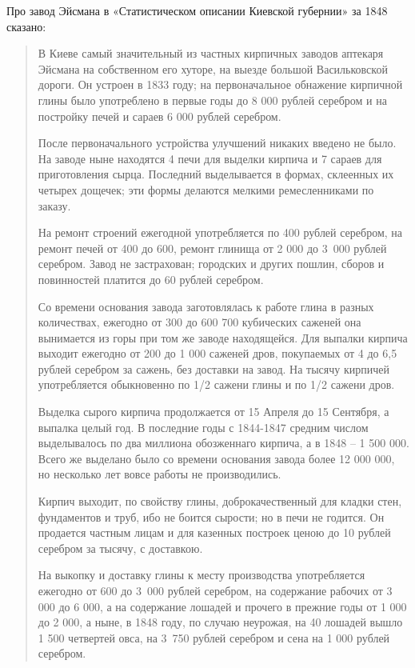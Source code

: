 Про завод Эйсмана в «Статистическом описании Киевской губернии»\cite{fundstat} за 1848 сказано:

\begin{quotation}
В Киеве самый значительный из частных кирпичных заводов аптекаря Эйсмана на собственном его хуторе, на выезде большой Васильковской дороги. Он устроен в 1833 году; на первоначальное обнажение кирпичной глины было употреблено в первые годы до 8 000 рублей серебром и на постройку печей и сараев 6 000 рублей серебром. 

После первоначального устройства улучшений никаких введено не было. На заводе ныне находятся 4 печи для выделки кирпича и 7 сараев для приготовления сырца. Последний выделывается в формах, склеенных их четырех дощечек; эти формы делаются мелкими ремесленниками по заказу. 

На ремонт строений ежегодной употребляется по 400 рублей серебром, на ремонт печей от 400 до 600, ремонт глинища от 2 000 до \mbox{3 000} рублей серебром. Завод не застрахован; городских и других пошлин, сборов и повинностей платится до 60 рублей серебром.

Со времени основания завода заготовлялась к работе глина в разных количествах, ежегодно от 300 до 600  700 кубических саженей она вынимается из горы при том же заводе находящейся. Для выпалки кирпича выходит ежегодно от 200 до 1 000 саженей дров, покупаемых от 4 до 6,5 рублей серебром за сажень, без доставки на завод. На тысячу кирпичей употребляется обыкновенно по 1/2 сажени глины и по 1/2 сажени дров.

Выделка сырого кирпича продолжается от 15 Апреля до 15 Сентября, а выпалка целый год. В последние годы с 1844-1847 средним числом выделывалось по два миллиона обозженнаго кирпича, а в 1848 – 1 500 000. Всего же выделано было со времени основания завода более 12 000 000, но несколько лет вовсе работы не производились.

Кирпич выходит, по свойству глины, доброкачественный для кладки стен, фундаментов и труб, ибо не боится сырости; но в печи не годится. Он продается частным лицам и для казенных построек ценою до 10 рублей серебром за тысячу, с доставкою.

На выкопку и доставку глины к месту производства употребляется ежегодно от 600 до \mbox{3 000} рублей серебром, на содержание рабочих от 3 000 до 6 000, а на содержание лошадей и прочего в прежние годы от 1 000 до 2 000, а ныне, в 1848 году, по случаю неурожая, на 40 лошадей вышло 1 500 четвертей овса, на \mbox{3 750} рублей серебром и сена на 1 000 рублей серебром.


\end{quotation}
